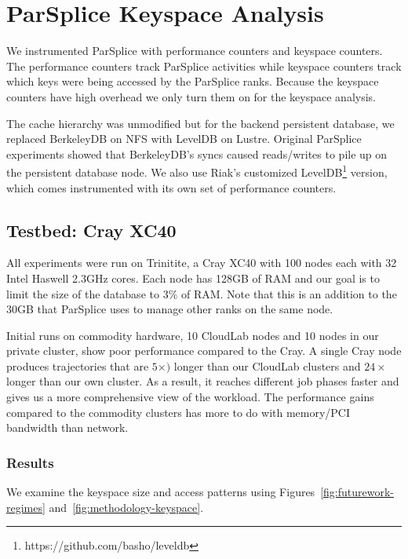 \section{ParSplice Keyspace Analysis}

We instrumented ParSplice with performance counters and keyspace counters.  The
performance counters track ParSplice activities while keyspace counters track
which keys were being accessed by the ParSplice ranks. Because the keyspace
counters have high overhead we only turn them on for the keyspace analysis.

The cache hierarchy was unmodified but for the backend persistent database, we
replaced BerkeleyDB on NFS with LevelDB on Lustre. Original ParSplice
experiments showed that BerkeleyDB's syncs caused reads/writes to pile up on
the persistent database node. We also use Riak's customized
LevelDB\footnote{https://github.com/basho/leveldb} version, which comes
instrumented with its own set of performance counters.

\subsection*{Testbed: Cray XC40}

All experiments were run on Trinitite, a Cray XC40 with 100 nodes each with 32
Intel Haswell 2.3GHz cores.  Each node has 128GB of RAM and our goal is to
limit the size of the database to 3\% of RAM. Note that this is an addition to
the 30GB that ParSplice uses to manage other ranks on the same node. 

Initial runs on commodity hardware, 10 CloudLab nodes and 10 nodes in our
private cluster, show poor performance compared to the Cray. A single Cray node
produces trajectories that are \(5\times)\) longer than our CloudLab clusters
and \(24\times\) longer than our own cluster. As a result, it reaches different
job phases faster and gives us a more comprehensive view of the workload. The
performance gains compared to the commodity clusters has more to do with
memory/PCI bandwidth than network.

\subsubsection*{Results}
\label{sec:results}
We examine the keyspace size and access patterns using
Figures~\ref{fig:futurework-regimes} and~\ref{fig:methodology-keyspace}.

